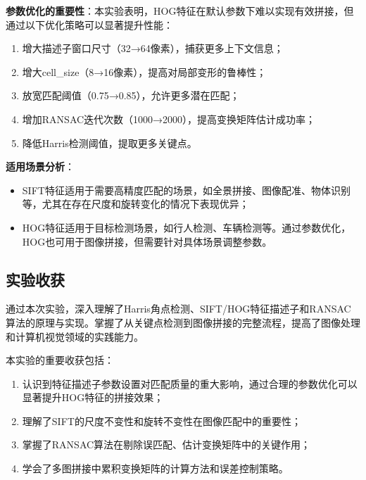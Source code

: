 \documentclass[a4paper]{article}
\begin{document}
\textbf{参数优化的重要性}：本实验表明，HOG特征在默认参数下难以实现有效拼接，但通过以下优化策略可以显著提升性能：
\begin{enumerate}
    \item 增大描述子窗口尺寸（32→64像素），捕获更多上下文信息；
    \item 增大cell\_size（8→16像素），提高对局部变形的鲁棒性；
    \item 放宽匹配阈值（0.75→0.85），允许更多潜在匹配；
    \item 增加RANSAC迭代次数（1000→2000），提高变换矩阵估计成功率；
    \item 降低Harris检测阈值，提取更多关键点。
\end{enumerate}

\textbf{适用场景分析}：
\begin{itemize}
    \item SIFT特征适用于需要高精度匹配的场景，如全景拼接、图像配准、物体识别等，尤其在存在尺度和旋转变化的情况下表现优异；
    \item HOG特征适用于目标检测场景，如行人检测、车辆检测等。通过参数优化，HOG也可用于图像拼接，但需要针对具体场景调整参数。
\end{itemize}

\subsection{实验收获}

通过本次实验，深入理解了Harris角点检测、SIFT/HOG特征描述子和RANSAC算法的原理与实现。掌握了从关键点检测到图像拼接的完整流程，提高了图像处理和计算机视觉领域的实践能力。

本实验的重要收获包括：
\begin{enumerate}
    \item 认识到特征描述子参数设置对匹配质量的重大影响，通过合理的参数优化可以显著提升HOG特征的拼接效果；
    \item 理解了SIFT的尺度不变性和旋转不变性在图像匹配中的重要性；
    \item 掌握了RANSAC算法在剔除误匹配、估计变换矩阵中的关键作用；
    \item 学会了多图拼接中累积变换矩阵的计算方法和误差控制策略。
\end{enumerate}
\end{document}
